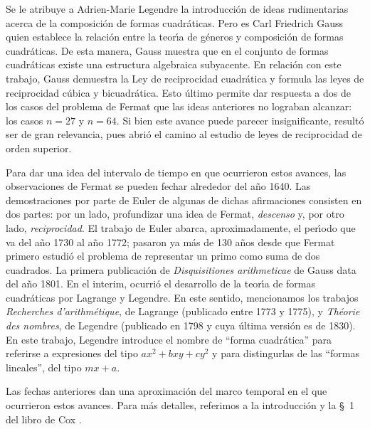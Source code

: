 Se le atribuye a Adrien-Marie Legendre la introducci\'on de ideas
rudimentarias acerca de la composici\'on de formas cuadr\'aticas. Pero es
Carl Friedrich Gauss quien establece la relaci\'on entre la teor\'{\i}a de
g\'eneros y composici\'on de formas cuadr\'aticas. De esta manera, Gauss
muestra que en el conjunto de formas cuadr\'aticas existe una estructura
algebraica subyacente. En relaci\'on con este trabajo, Gauss demuestra la
Ley de reciprocidad cuadr\'atica y formula las leyes de reciprocidad
c\'ubica y bicuadr\'atica. Esto \'ultimo permite dar respuesta a dos de los
casos del problema de Fermat que las ideas anteriores no lograban alcanzar:
los casos $n=27$ y $n=64$. Si bien este avance puede parecer insignificante,
result\'o ser de gran relevancia, pues abri\'o el camino al estudio de leyes
de reciprocidad de orden superior.

Para dar una idea del intervalo de tiempo en que ocurrieron estos avances,
las observaciones de Fermat se pueden fechar alrededor del a\~no 1640.
Las demostraciones por parte de Euler de algunas de dichas afirmaciones
consisten en dos partes: por un lado, profundizar una idea de Fermat,
\emph{descenso} y, por otro lado, \emph{reciprocidad}. El trabajo de Euler
abarca, aproximadamente, el per\'{\i}odo que va del a\~no 1730 al a\~no 1772;
pasaron ya m\'as de 130 a\~nos desde que Fermat primero estudi\'o el problema
de representar un primo como suma de dos cuadrados.
La primera publicaci\'on de \emph{Disquisitiones arithmeticae} de Gauss data
del a\~no 1801. En el interim, ocurri\'o el desarrollo de la teor\'{\i}a de
formas cuadr\'aticas por Lagrange y Legendre. En este sentido, mencionamos
los trabajos \emph{Recherches d'arithm\'etique}, de Lagrange (publicado
entre 1773 y 1775), y \emph{Th\'eorie des nombres}, de Legendre (publicado
en 1798 y cuya \'ultima versi\'on es de 1830). En este trabajo, Legendre
introduce el nombre de ``forma cuadr\'atica'' para referirse a expresiones
del tipo $ax^2+bxy+cy^2$ y para distingurlas de las ``formas lineales'', del
tipo $mx+a$.

Las fechas anteriores dan una aproximaci\'on del marco temporal en el que
ocurrieron estos avances. Para m\'as detalles, referimos a la introducci\'on y
la \S~1 del libro de Cox \cite{Cox}.

